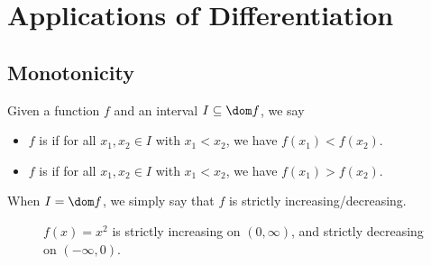 \chapter{Applications of Differentiation}

\section{Monotonicity}

\begin{definition}
    Given a function $f$ and an interval $I \subseteq \dom f$, we say
    \begin{itemize}
        \item $f$ is  if for all $x_1, x_2 \in I$ with $x_1 < x_2$, we have $f(x_1) < f(x_2)$.
        \item $f$ is  if for all $x_1, x_2 \in I$ with $x_1 < x_2$, we have $f(x_1) > f(x_2)$.
    \end{itemize}
\end{definition}

When $I = \dom f$, we simply say that $f$ is strictly increasing/decreasing.

\begin{figure}[H]
    \centering
    \caption{$f(x) = x^2$ is strictly increasing on $(0, \infty)$, and strictly decreasing on $(-\infty, 0)$.}
\end{figure}

